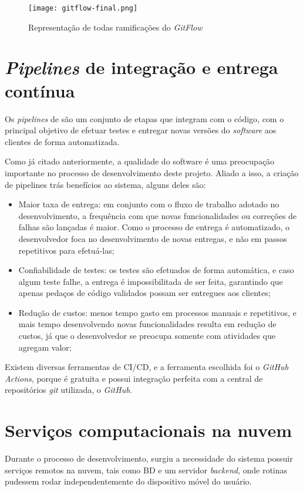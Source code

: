 \begin{figure}[!htb]
    \centering
    \texttt{[image: gitflow-final.png]}
    \caption{Representação de todas ramificações do \textit{GitFlow}}
    \label{fig:gitflow4}
\end{figure}


\section{\textit{Pipelines} de integração e entrega contínua}\label{sec:pipelines}
Os \textit{pipelines} de  são um conjunto de etapas que integram com o código, com o principal objetivo de efetuar testes e entregar novas versões do \textit{software} aos clientes de forma automatizada.

Como já citado anteriormente, a qualidade do software é uma preocupação importante no processo de desenvolvimento deste projeto. Aliado a isso, a criação de pipelines trás benefícios ao sistema, alguns deles são:
\begin{itemize}
    \item Maior taxa de entrega: em conjunto com o fluxo de trabalho adotado no desenvolvimento, a frequência com que novas funcionalidades ou correções de falhas são lançadas é maior. Como o processo de entrega é automatizado, o desenvolvedor foca no desenvolvimento de novas entregas, e não em passos repetitivos para efetuá-las;
    \item Confiabilidade de testes: os testes são efetuados de forma automática, e caso algum teste falhe, a entrega é impossibilitada de ser feita, garantindo que apenas pedaços de código validados possam ser entregues aos clientes;
    \item Redução de custos: menos tempo gasto em processos manuais e repetitivos, e mais tempo desenvolvendo novas funcionalidades resulta em redução de custos, já que o desenvolvedor se preocupa somente com atividades que agregam valor;
\end{itemize}

Existem diversas ferramentas de CI/CD, e a ferramenta escolhida foi o \textit{GitHub Actions}, porque é gratuita e possui integração perfeita com a central de repositórios \textit{git} utilizada, o \textit{GitHub}.

\section{Serviços computacionais na nuvem}\label{sec:googlefirebase}
Durante o processo de desenvolvimento, surgiu a necessidade do sistema possuir serviços remotos na nuvem, tais como BD e um servidor \textit{backend}, onde rotinas pudessem rodar independentemente do dispositivo móvel do usuário.

